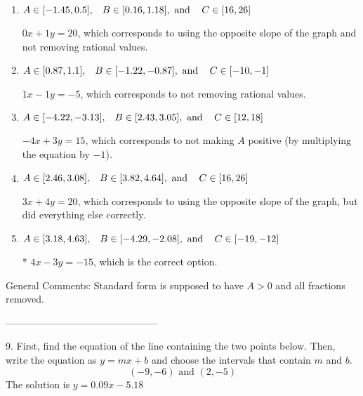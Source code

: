 \documentclass{article}[14pt]
\begin{document}
\begin{enumerate}[label=\Alph*.] 
\item $ A \in [-1.45, 0.5], \hspace{3mm} B \in [0.16, 1.18], \text{ and } \hspace{3mm} C \in [16, 26] $ 

  $0x + 1y = 20$, which corresponds to using the opposite slope of the graph and not removing rational values. 
\item $ A \in [0.87, 1.1], \hspace{3mm} B \in [-1.22, -0.87], \text{ and } \hspace{3mm} C \in [-10, -1] $ 

  $1x - 1y = -5$, which corresponds to not removing rational values. 
\item $ A \in [-4.22, -3.13], \hspace{3mm} B \in [2.43, 3.05], \text{ and } \hspace{3mm} C \in [12, 18] $ 

  $-4x + 3y = 15$, which corresponds to not making $A$ positive (by multiplying the equation by $-1$). 
\item $ A \in [2.46, 3.08], \hspace{3mm} B \in [3.82, 4.64], \text{ and } \hspace{3mm} C \in [16, 26] $ 

  $3x + 4y = 20$, which corresponds to using the opposite slope of the graph, but did everything else correctly. 
\item $ A \in [3.18, 4.63], \hspace{3mm} B \in [-4.29, -2.08], \text{ and } \hspace{3mm} C \in [-19, -12] $ 

 * $4x - 3y = -15$, which is the correct option. 
\end{enumerate} 
 
General Comments: Standard form is supposed to have $A > 0$ and all fractions removed.

-----------------------------------------------

9. First, find the equation of the line containing the two points below. Then, write the equation as $ y=mx+b $ and choose the intervals that contain $m$ and $b$.
$$ (-9, -6) \text{ and } (2, -5) $$ 
The solution is $ y = 0.09x - 5.18 $ 
\end{document}
